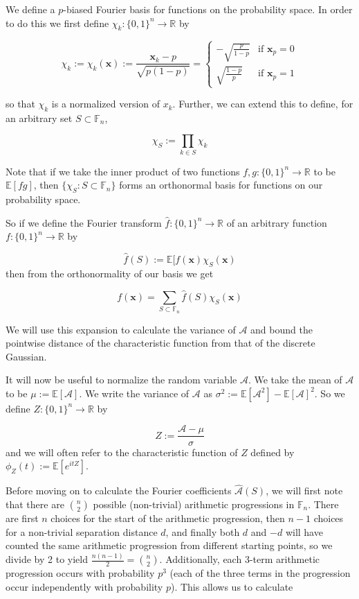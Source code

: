 \documentclass[12pt]{article} %
\newcommand{\ap}{\mathcal{A}}
\newcommand{\E}{\mathbb{E}}
\newcommand{\F}{\mathbb{F}}
\newcommand{\bbr}{\mathbb{R}}
\newcommand{\bfx}{\mathbf{x}}
\theoremstyle{definition}
\theoremstyle{remark}
\begin{document}
We define a $p$-biased Fourier basis for functions on the probability space. In order to do this we first define $\chi_k : \{0,1\}^n \to \bbr$ by

\[\chi_k := \chi_k(\bfx) := \frac{\bfx_k - p}{\sqrt{p(1-p)}} = \begin{cases} 
      -\sqrt{\frac{p}{1-p}} & \text{if } \bfx_p = 0 \\[10pt]
      \sqrt{\frac{1-p}{p}} & \text{if } \bfx_p = 1
\end{cases} \]

so that $\chi_k$ is a normalized version of $x_k$. Further, we can extend this to define, for an arbitrary set $S \subset \F_n$,

\[\chi_S := \prod_{k \in S} {\chi_k} \]

Note that if we take the inner product of two functions $f, g : \{0,1\}^n \to \bbr$ to be $\E[fg]$, then $\{\chi_S : S \subset \F_n\}$ forms an orthonormal basis for functions on our probability space.

So if we define the Fourier transform $\hat{f} : \{0,1\}^n \to \bbr$ of an arbitrary function $f : \{0,1\}^n \to \bbr$ by

\[\hat{f}(S) := \E[f(\bfx)\chi_S(\bfx)\]
then from the orthonormality of our basis we get

\[f(\bfx) = \sum_{S \subset \F_n} {\hat{f}(S)\chi_S(\bfx)}\]

We will use this expansion to calculate the variance of $\ap$ and bound the pointwise distance of the characteristic function from that of the discrete Gaussian.

It will now be useful to normalize the random variable $\ap$. We take the mean of $\ap$ to be $\mu := \E[\ap]$. We write the variance of $\ap$ as $\sigma^2 := \E[\ap^2] - \E[\ap]^2$. So we define $Z : \{0,1\}^n \to \bbr$ by

\[Z := \frac{\ap - \mu}{\sigma}\]
and we will often refer to the characteristic function of $Z$ defined by $\phi_Z(t) := \E[e^{itZ}]$.

Before moving on to calculate the Fourier coefficients $\hat{\ap}(S)$, we will first note that there are $\binom{n}{2}$ possible (non-trivial) arithmetic progressions in $\F_n$. There are first $n$ choices for the start of the arithmetic progression, then $n-1$ choices for a non-trivial separation distance $d$, and finally both $d$ and $-d$ will have counted the same arithmetic progression from different starting points, so we divide by 2 to yield $\frac{n(n-1)}{2} = \binom{n}{2}$. Additionally, each 3-term arithmetic progression occurs with probability $p^3$ (each of the three terms in the progression occur independently with probability $p$). This allows us to calculate
\end{document}
